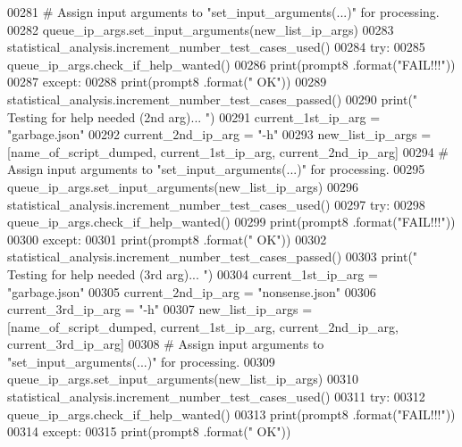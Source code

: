 \begin{DoxyCode}
00281         \textcolor{comment}{#   Assign input arguments to "set\_input\_arguments(...)" for processing.}
00282         queue\_ip\_args.set\_input\_arguments(new\_list\_ip\_args)
00283         statistical\_analysis.increment\_number\_test\_cases\_used()
00284         \textcolor{keywordflow}{try}:
00285             queue\_ip\_args.check\_if\_help\_wanted()
00286             print(prompt8 .format(\textcolor{stringliteral}{"FAIL!!!"}))
00287         \textcolor{keywordflow}{except}:
00288             print(prompt8 .format(\textcolor{stringliteral}{" OK"}))
00289             statistical\_analysis.increment\_number\_test\_cases\_passed()
00290         print(\textcolor{stringliteral}{" Testing for help needed (2nd arg)... "})
00291         current\_1st\_ip\_arg = \textcolor{stringliteral}{"garbage.json"}
00292         current\_2nd\_ip\_arg = \textcolor{stringliteral}{"-h"}
00293         new\_list\_ip\_args = [name\_of\_script\_dumped, current\_1st\_ip\_arg, current\_2nd\_ip\_arg]
00294         \textcolor{comment}{#   Assign input arguments to "set\_input\_arguments(...)" for processing.}
00295         queue\_ip\_args.set\_input\_arguments(new\_list\_ip\_args)
00296         statistical\_analysis.increment\_number\_test\_cases\_used()
00297         \textcolor{keywordflow}{try}:
00298             queue\_ip\_args.check\_if\_help\_wanted()
00299             print(prompt8 .format(\textcolor{stringliteral}{"FAIL!!!"}))
00300         \textcolor{keywordflow}{except}:
00301             print(prompt8 .format(\textcolor{stringliteral}{" OK"}))
00302             statistical\_analysis.increment\_number\_test\_cases\_passed()
00303         print(\textcolor{stringliteral}{" Testing for help needed (3rd arg)... "})
00304         current\_1st\_ip\_arg = \textcolor{stringliteral}{"garbage.json"}
00305         current\_2nd\_ip\_arg = \textcolor{stringliteral}{"nonsense.json"}
00306         current\_3rd\_ip\_arg = \textcolor{stringliteral}{"-h"}
00307         new\_list\_ip\_args = [name\_of\_script\_dumped, current\_1st\_ip\_arg, current\_2nd\_ip\_arg, 
      current\_3rd\_ip\_arg]
00308         \textcolor{comment}{#   Assign input arguments to "set\_input\_arguments(...)" for processing.}
00309         queue\_ip\_args.set\_input\_arguments(new\_list\_ip\_args)
00310         statistical\_analysis.increment\_number\_test\_cases\_used()
00311         \textcolor{keywordflow}{try}:
00312             queue\_ip\_args.check\_if\_help\_wanted()
00313             print(prompt8 .format(\textcolor{stringliteral}{"FAIL!!!"}))
00314         \textcolor{keywordflow}{except}:
00315             print(prompt8 .format(\textcolor{stringliteral}{" OK"}))

\end{DoxyCode}

